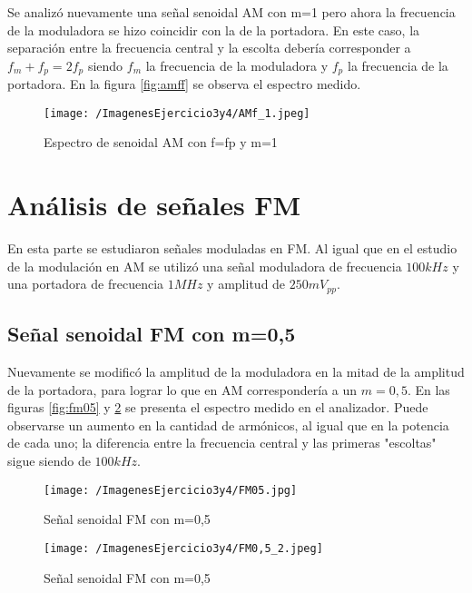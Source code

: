 Se analizó nuevamente una señal senoidal AM con m=1 pero ahora la frecuencia de la moduladora se hizo coincidir con la de la portadora. En este caso, la separación entre la frecuencia central y la escolta debería corresponder a $f_m+f_p=2f_p$ siendo $f_m$ la frecuencia de la moduladora y $f_p$ la frecuencia de la portadora. En la figura \ref{fig:amff} se observa el espectro medido.

\begin{figure}[H]
	\centering
	\texttt{[image: /ImagenesEjercicio3y4/AMf\_1.jpeg]}
\caption{Espectro de senoidal AM con f=fp y m=1}
	\label{fig:hello}
\end{figure}

\section{Análisis de señales FM}

En esta parte se estudiaron señales moduladas en FM. Al igual que en el estudio de la modulación en AM se utilizó una señal moduladora de frecuencia $100 kHz$ y una portadora de frecuencia $1 MHz$ y amplitud de $250 mV_{pp}$.

\subsection{Señal senoidal FM con m=0,5}
Nuevamente se modificó la amplitud de la moduladora en la mitad de la amplitud de la portadora, para lograr lo que en AM correspondería a un $m=0,5$. En las figuras \ref{fig:fm05} y \ref{fig:fm055} se presenta el espectro medido en el analizador. Puede observarse un aumento en la cantidad de armónicos, al igual que en la potencia de cada uno; la diferencia entre la frecuencia central y las primeras "escoltas" sigue siendo de $100 kHz$.

\begin{figure}[H]
  \centering
  \begin{minipage}[b]{0.6\textwidth}
    \texttt{[image: /ImagenesEjercicio3y4/FM05.jpg]}
    \caption{Señal senoidal FM con m=0,5}
    \label{fig:fm05}
  \end{minipage}
  \hfill
  \begin{minipage}[b]{0.6\textwidth}
    \texttt{[image: /ImagenesEjercicio3y4/FM0,5\_2.jpeg]}
    \caption{Señal senoidal FM con m=0,5}
    \label{fig:fm055}
  \end{minipage}
\end{figure}

